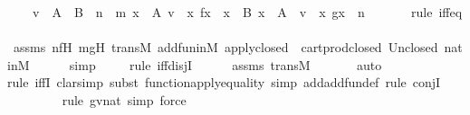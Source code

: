 \begin{isabellebody}
\ {\isachardoublequoteopen}{\isachardot}{\kern0pt}{\isachardot}{\kern0pt}{\isachardot}{\kern0pt}\ {\isacharequal}{\kern0pt}\ {\isacharbraceleft}{\kern0pt}\ v\ {\isasymin}\ {\isacharparenleft}{\kern0pt}A\ {\isasymunion}\ B{\isacharparenright}{\kern0pt}\ {\isasymtimes}\ {\isacharparenleft}{\kern0pt}n\ {\isacharhash}{\kern0pt}{\isacharplus}{\kern0pt}\ m{\isacharparenright}{\kern0pt}{\isachardot}{\kern0pt}\ {\isacharparenleft}{\kern0pt}{\isasymexists}x\ {\isasymin}\ A{\isachardot}{\kern0pt}\ v\ {\isacharequal}{\kern0pt}\ {\isacharless}{\kern0pt}x{\isacharcomma}{\kern0pt}\ f{\isacharbackquote}{\kern0pt}x{\isachargreater}{\kern0pt}{\isacharparenright}{\kern0pt}\ {\isasymor}\ {\isacharparenleft}{\kern0pt}{\isasymexists}x\ {\isasymin}\ B{\isachardot}{\kern0pt}\ x\ {\isasymnotin}\ A\ {\isasymand}\ v\ {\isacharequal}{\kern0pt}\ {\isacharless}{\kern0pt}x{\isacharcomma}{\kern0pt}\ g{\isacharbackquote}{\kern0pt}x\ {\isacharhash}{\kern0pt}{\isacharplus}{\kern0pt}\ n{\isachargreater}{\kern0pt}{\isacharparenright}{\kern0pt}\ {\isacharbraceright}{\kern0pt}{\isachardoublequoteclose}\ \isanewline
\ \ \ \ \isamarkupfalse%
{\isacharparenleft}{\kern0pt}rule\ iff{\isacharunderscore}{\kern0pt}eq{\isacharparenright}{\kern0pt}\isanewline
\ \ \ \ \isamarkupfalse%
\ assms\ nfH\ mgH\ transM\ add{\isacharunderscore}{\kern0pt}fun{\isacharunderscore}{\kern0pt}in{\isacharunderscore}{\kern0pt}M\ apply{\isacharunderscore}{\kern0pt}closed\ \ cartprod{\isacharunderscore}{\kern0pt}closed\ Un{\isacharunderscore}{\kern0pt}closed\ nat{\isacharunderscore}{\kern0pt}in{\isacharunderscore}{\kern0pt}M\isanewline
\ \ \ \ \isamarkupfalse%
\ simp\isanewline
\ \ \ \ \isamarkupfalse%
{\isacharparenleft}{\kern0pt}rule\ iff{\isacharunderscore}{\kern0pt}disjI{\isacharparenright}{\kern0pt}\isanewline
\ \ \ \ \isamarkupfalse%
\ assms\ transM\isanewline
\ \ \ \ \ \isamarkupfalse%
\ auto{\isacharbrackleft}{\kern0pt}{}{\isacharbrackright}{\kern0pt}\isanewline
\ \ \ \ \isamarkupfalse%
{\isacharparenleft}{\kern0pt}rule\ iffI{\isacharcomma}{\kern0pt}\ clarsimp{\isacharcomma}{\kern0pt}\ subst\ function{\isacharunderscore}{\kern0pt}apply{\isacharunderscore}{\kern0pt}equality{\isacharcomma}{\kern0pt}\ simp\ add{\isacharcolon}{\kern0pt}add{\isacharunderscore}{\kern0pt}fun{\isacharunderscore}{\kern0pt}def{\isacharcomma}{\kern0pt}\ rule\ conjI{\isacharparenright}{\kern0pt}\isanewline
\ \ \ \ \ \ \ \ \isamarkupfalse%
{\isacharparenleft}{\kern0pt}rule\ gvnat{\isacharcomma}{\kern0pt}\ simp{\isacharcomma}{\kern0pt}\ force{\isacharparenright}{\kern0pt}\isanewline

\end{isabellebody}
